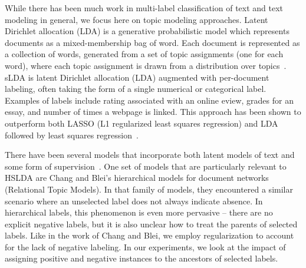 While there has been much work in multi-label classification of text and
text modeling in general, we focus here on topic modeling approaches.
Latent Dirichlet allocation (LDA) is a generative probabilistic model which
represents documents as a mixed-membership bag of word. Each document is
represented as a collection of words, generated from a set of topic assignments
(one for each word), where each topic assignment is drawn from a distribution
over topics~\citep{Blei2003}. sLDA is latent Dirichlet allocation (LDA)
\cite{Blei2003} augmented with per-document labeling, often taking the form of
a single numerical or categorical label. Examples of labels include rating
associated with an online  eview, grades for an essay, and number of times a
webpage is linked. This approach has been shown to outperform both LASSO
(L1 regularized least squares regression) and LDA followed by least
squares regression~\cite{BleiMcAuliffe2008}.

There have been several models that incorporate both latent models of text and
some form of
supervision~\citep{Ramage2009,DiscLDA,wangbleifeifei08,RelationalLDA}. One set 
of models that are particularly relevant to HSLDA are Chang and Blei's
hierarchical models for document networks (Relational Topic Models). In that
family of models, they encountered a similar scenario where an unselected label 
does not always indicate absence. In hierarchical labels, this phenomenon is
even more pervasive -- there are no explicit negative labels, but it is also
unclear how to treat the parents of selected labels. Like in the work of Chang
and Blei, we employ regularization to account for the lack of negative
labeling. In our experiments, we look at the impact of assigning positive and
negative instances to the ancestors of selected labels.
